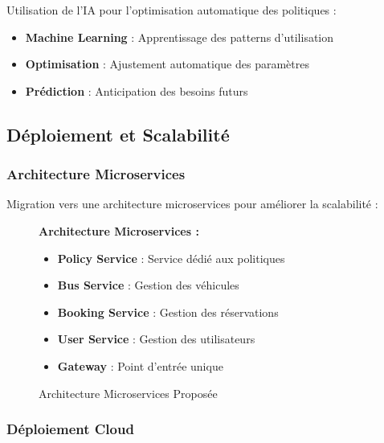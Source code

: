 \documentclass[12pt,a4paper]{article}
\begin{document}
    Utilisation de l'IA pour l'optimisation automatique des politiques :

    \begin{itemize}
        \item \textbf{Machine Learning} : Apprentissage des patterns d'utilisation
        \item \textbf{Optimisation} : Ajustement automatique des paramètres
        \item \textbf{Prédiction} : Anticipation des besoins futurs
    \end{itemize}

    \subsection{Déploiement et Scalabilité}

    \subsubsection{Architecture Microservices}

    Migration vers une architecture microservices pour améliorer la scalabilité :

    \begin{figure}[H]
        \centering
        \begin{tcolorbox}[colback=secondarygreen!5,colframe=secondarygreen,width=0.9\textwidth]
            \textbf{Architecture Microservices :}
            \begin{itemize}
                \item \textbf{Policy Service} : Service dédié aux politiques
                \item \textbf{Bus Service} : Gestion des véhicules
                \item \textbf{Booking Service} : Gestion des réservations
                \item \textbf{User Service} : Gestion des utilisateurs
                \item \textbf{Gateway} : Point d'entrée unique
            \end{itemize}
        \end{tcolorbox}
        \caption{Architecture Microservices Proposée}
    \end{figure}

    \subsubsection{Déploiement Cloud}
\end{document}
